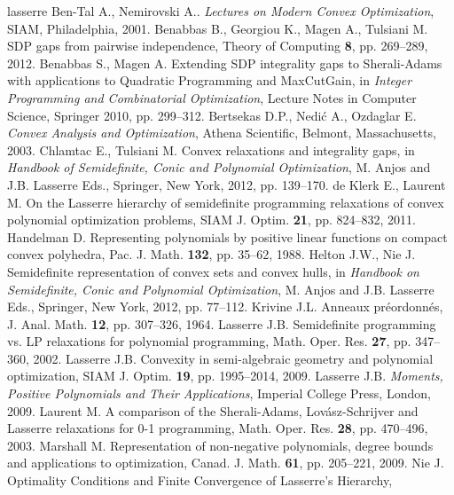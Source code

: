 \documentclass[11pt]{article}
\numberwithin{equation}{section}
\begin{document}
\begin{thebibliography}{lasserre}
Ben-Tal A., Nemirovski A.. {\em Lectures on
Modern Convex Optimization}, SIAM, Philadelphia, 2001.
Benabbas B., Georgiou K., Magen A., Tulsiani M. SDP gaps from pairwise independence,
Theory of Computing {\bf 8}, pp. 269--289, 2012.
Benabbas S., Magen A. Extending {SDP} integrality gaps to {S}herali-{A}dams with applications to
{Q}uadratic {P}rogramming and {M}ax{C}ut{G}ain, in {\em Integer Programming and Combinatorial Optimization},
Lecture Notes in Computer Science, Springer 2010, pp. 299--312.
Bertsekas D.P., Nedi\'c A., Ozdaglar E. {\em Convex Analysis and Optimization}, 
Athena Scientific, Belmont, Massachusetts, 2003.
Chlamtac E., Tulsiani M. Convex relaxations and integrality gaps, in {\em Handbook of {S}emidefinite, {C}onic and {P}olynomial {O}ptimization}, 
M. Anjos and J.B. Lasserre Eds., Springer, New {Y}ork, 2012, pp. 139--170.
de Klerk E., Laurent M. On the {L}asserre hierarchy of semidefinite programming relaxations of convex polynomial optimization problems,
SIAM J. Optim. {\bf 21}, pp. 824--832, 2011.
Handelman D. Representing polynomials by positive linear functions on compact convex polyhedra,
 Pac. J. Math. {\bf 132}, pp. 35--62, 1988.
Helton J.W., Nie J. Semidefinite representation of convex sets and convex hulls,
in {\em Handbook on {S}emidefinite, {C}onic and {P}olynomial {O}ptimization},
M. Anjos and J.B. Lasserre Eds., Springer, New York, 2012, pp. 
77--112.
Krivine J.L. Anneaux pr\'eordonn\'es, J. Anal. Math.  {\bf 12}, pp. 307--326, 1964.
Lasserre J.B. Semidefinite programming vs. {LP} relaxations for 
polynomial programming, Math.  Oper.  Res. {\bf 27}, pp. 347--360, 2002.
Lasserre J.B. Convexity in semi-algebraic geometry and polynomial optimization, SIAM J. Optim. {\bf 19}, pp. 1995--2014, 2009.
Lasserre J.B. {\em Moments, {P}ositive {P}olynomials and {T}heir {A}pplications}, Imperial College Press, London, 2009.
Laurent M.  A comparison of the {S}herali-{A}dams, {L}ov\'asz-{S}chrijver and {L}asserre relaxations for 0-1 programming,
  Math. Oper. Res. {\bf 28}, pp. 470--496, 2003.
Marshall M. Representation of non-negative polynomials, degree bounds and applications to optimization,
Canad. J. Math. {\bf 61}, pp. 205--221, 2009.
Nie J. Optimality Conditions and Finite Convergence of {L}asserre's Hierarchy,

\end{thebibliography}
\end{document}
